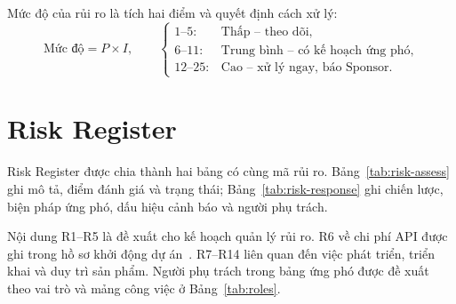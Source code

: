 \documentclass[12pt,a4paper]{report}
\begin{document}
Mức độ của rủi ro là tích hai điểm và quyết định cách xử lý:
\begin{equation}
  \label{eq:risk-level}
  \text{Mức độ} = P \times I, \qquad
  \begin{cases}
    1\text{--}5: & \text{Thấp -- theo dõi,} \\
    6\text{--}11: & \text{Trung bình -- có kế hoạch ứng phó,} \\
    12\text{--}25: & \text{Cao -- xử lý ngay, báo Sponsor.}
  \end{cases}
\end{equation}

\section{Risk Register}

Risk Register được chia thành hai bảng có cùng mã rủi ro. Bảng~\ref{tab:risk-assess} ghi mô tả, điểm đánh giá
và trạng thái; Bảng~\ref{tab:risk-response} ghi chiến lược, biện pháp ứng phó, dấu hiệu cảnh báo và người phụ
trách.

Nội dung R1--R5 là đề xuất cho kế hoạch quản lý rủi ro. R6 về chi phí API được ghi trong hồ sơ khởi động
dự án~\cite{pid}. R7--R14 liên quan đến việc phát triển, triển khai và duy trì sản phẩm. Người phụ trách
trong bảng ứng phó được đề xuất theo vai trò và mảng công việc ở Bảng~\ref{tab:roles}.
\end{document}
